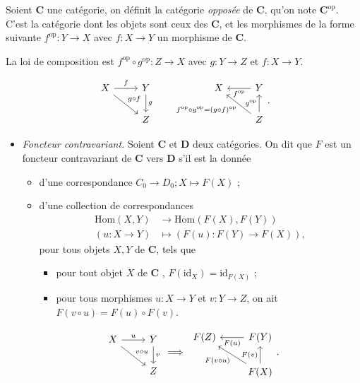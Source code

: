 \begin{defn}
  Soient $\mathbf{C}$ une catégorie, on définit la catégorie \textit{opposée} de $\mathbf{C}$, qu'on note $\mathbf{C}^\mathrm{op}$.
  C'est la catégorie dont les objets sont ceux des $\mathbf{C}$, et les morphismes de la forme suivante $f^\mathrm{op} : Y\to X$ avec $f : X \to Y$ un morphisme de $\mathbf{C}$.

  La loi de composition est $f^\mathrm{op} \circ g^\mathrm{op} : Z \to X$ avec $g : Y \to Z$ et $f : X \to Y$.

  \[
  \begin{tikzcd}
    X \arrow{r}{f} \arrow{dr}{g\circ f} & Y \arrow{d}{g}\\
    & Z
  \end{tikzcd}
  \quad\quad
  \begin{tikzcd}
    X & Y \arrow{l}{f^\mathrm{op}}\\
    & Z \arrow{u}{g^\mathrm{op}} \arrow{ul}{f^\mathrm{op}\circ g^\mathrm{op} = (g \circ f)^\mathrm{op}}
  \end{tikzcd}
  .\]
\end{defn}

\begin{exm}
  \begin{itemize}
    \item \textsl{Foncteur contravariant.}
      Soient $\mathbf{C}$ et $\mathbf{D}$ deux catégories.
      On dit que $F$ est un foncteur contravariant de $\mathbf{C}$ vers $\mathbf{D}$ s'il est la donnée
      \begin{itemize}
        \item d'une correspondance $C_0 \to D_0 ; X \mapsto F(X)$ ;
        \item d'une collection de correspondances 
          \begin{align*}
            \mathrm{Hom}(X,Y) &\longrightarrow \mathrm{Hom}(F(X),F(Y)) \\
            (u : X \to Y) &\longmapsto (F(u) : F(Y) \to F(X))
          ,\end{align*}
          pour tous objets  $X,Y$ de  $\mathbf{C}$, tels que 
          \begin{itemize}
            \item pour tout objet $X$ de $\mathbf{C}$ , $F(\mathrm{id}_X) = \mathrm{id}_{F(X)}$ ;
            \item pour tous morphismes $u : X \to Y$ et $v : Y \to Z$, on ait $F(v \circ u) = F(u) \circ F(v)$.
          \end{itemize}
      \end{itemize}

      \[
      \begin{tikzcd}
        X \arrow{r}{u} \arrow{dr}{v\circ u} & Y \arrow{d}{v}\\
        & Z
      \end{tikzcd}
        \implies
      \begin{tikzcd}
        F(Z) & \arrow{l}{F(u)} F(Y)\\
        & F(X) \arrow{u}{F(v)} \arrow{ul}{F(v\circ u)}
      \end{tikzcd}
      .\] 
  \end{itemize}
\end{exm}

